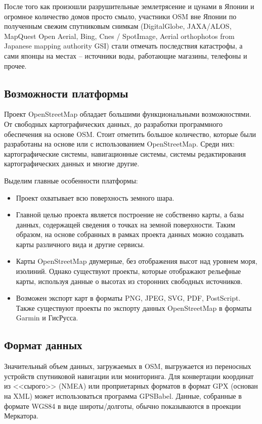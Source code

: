 После того как произошли разрушительные землетрясение и цунами в Японии и 
огромное количество домов просто смыло, участники OSM вне Японии по полученным 
свежим спутниковым снимкам (DigitalGlobe, JAXA/ALOS, MapQuest Open Aerial, 
Bing, Cnes / SpotImage, Aerial orthophotos from Japanese mapping authority 
GSI) стали отмечать последствия катастрофы, а сами японцы на местах -- 
источники воды, работающие магазины, телефоны и прочее.\cite{osmwiki}

\subsection{Возможности платформы}
Проект OpenStreetMap обладает большими функциональными возможностями. От 
свободных картографических данных, до разработки программного обеспечения на 
основе OSM. Стоит отметить большое количество, которые были разработаны на 
основе или с использованием OpenStreetMap. Среди них: картографические 
системы, навигационные системы, системы редактирования картографических данных 
и многие другие.\cite{osmwiki}

Выделим главные особенности платформы:
\begin{itemize}
    \item Проект охватывает всю поверхность земного шара.
    \item Главной целью проекта является построение не собственно карты, а 
        базы данных, содержащей сведения о точках на земной поверхности. Таким 
        образом, на основе собранных в рамках проекта данных можно создавать 
        карты различного вида и другие сервисы.
    \item Карты OpenStreetMap двумерные, без отображения высот над уровнем 
        моря, изолиний. Однако существуют проекты, которые отображают 
        рельефные карты, используя данные о высотах из сторонних свободных 
        источников.
    \item Возможен экспорт карт в форматы PNG, JPEG, SVG, PDF, PostScript. 
        Также существуют проекты по экспорту данных OpenStreetMap в форматы 
        Garmin и ГисРусса.
\end{itemize}

\subsection{Формат данных}
Значительный объем данных, загружаемых в OSM, выгружается из переносных 
устройств спутниковой навигации или мониторинга. Для конвертации координат 
из <<сырого>> (NMEA) или проприетарных форматов в формат GPX (основан на XML) 
может использоваться программа GPSBabel. Данные, собранные в формате WGS84 в 
виде широты/долготы, обычно показываются в проекции Меркатора\cite{projection}.

